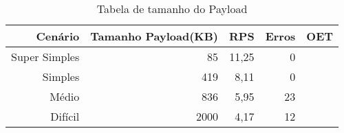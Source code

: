 \begin{table}[!htb]
    \centering
    \caption[Resultado \textit{payload}]{Tabela de tamanho do Payload 
    \label{tab:result-payload}}
    \begin{tabular}{rrrrr}
        \toprule
            Cenário & Tamanho Payload(KB) & RPS & Erros & OET \\ 
        \midrule
            Super Simples & 85 & 11,25 & 0 \\
            Simples & 419 & 8,11 & 0 \\
            Médio & 836 & 5,95 & 23 \\
            Difícil & 2000 & 4,17 & 12 \\
        \bottomrule
    \end{tabular}
\end{table}